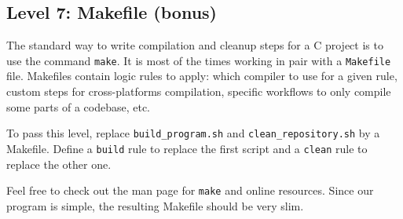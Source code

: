 \documentclass[12pt]{article}
\begin{document}
\subsection{Level 7: Makefile (bonus)}

The standard way to write compilation and cleanup steps for a C project is to use the command \texttt{make}. It is most of the times working in pair with a \texttt{Makefile} file. Makefiles contain logic rules to apply: which compiler to use for a given rule, custom steps for cross-platforms compilation, specific workflows to only compile some parts of a codebase, etc.

To pass this level, replace \texttt{build\_program.sh} and \texttt{clean\_repository.sh} by a Makefile. Define a \texttt{build} rule to replace the first script and a \texttt{clean} rule to replace the other one.

Feel free to check out the man page for \texttt{make} and online resources. Since our program is simple, the resulting Makefile should be very slim.
\end{document}
